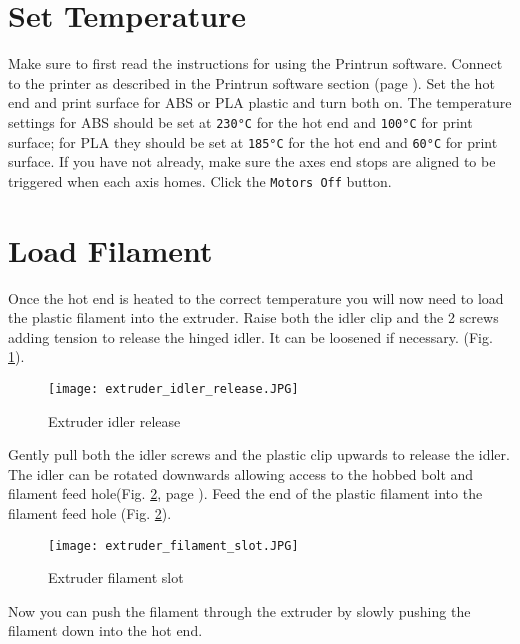 \section{Set Temperature}
Make sure to first read the instructions for using the Printrun software. Connect to the printer as described in the Printrun software section
(page \pageref{Printrun}). Set the hot end and print surface for ABS or PLA plastic and turn both on. The temperature settings for ABS should be set at \texttt{230°C} for the hot end and \texttt{100°C} for print surface; for PLA they should be set at \texttt{185°C} for the hot end and \texttt{60°C} for print surface. If you have not already, make sure the axes end stops are aligned to be triggered when each axis homes. Click the \texttt{Motors Off} button.
\section{Load Filament}
Once the hot end is heated to the correct temperature you will now need to load the plastic filament into the extruder. Raise both the idler clip and the 2 screws adding tension to release the hinged idler. It can be loosened if necessary.
(Fig. \ref{fig:extruder_idler_release}).
\begin{figure}[hbt]
\centering
\texttt{[image: extruder\_idler\_release.JPG]}
\caption{Extruder idler release}
\label{fig:extruder_idler_release}
\end{figure}
Gently pull both the idler screws and the plastic clip upwards to release the idler. The idler can be rotated downwards allowing access to the hobbed bolt and filament feed hole(Fig. \ref{fig:extruder_filament_slot}, page \pageref{fig:extruder_filament_slot}). Feed the end of the plastic filament into the filament feed hole
(Fig. \ref{fig:extruder_filament_slot}).
\begin{figure}[htb]
\centering
\texttt{[image: extruder\_filament\_slot.JPG]}
\caption{Extruder filament slot}
\label{fig:extruder_filament_slot}
\end{figure}
Now you can push the filament through the extruder by slowly pushing the filament down into the hot end.

